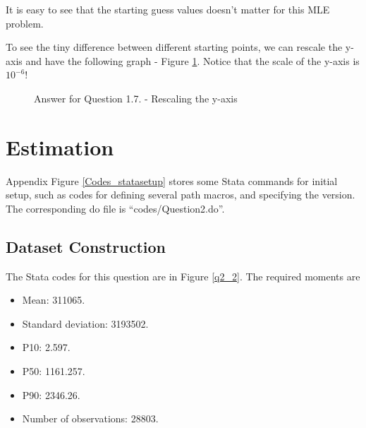 \documentclass[12pt]{article}
\theoremstyle{definition}
\begin{document}
It is easy to see that the starting guess values doesn't matter for this MLE problem.

To see the tiny difference between different starting points, we can rescale the y-axis and have the following graph - Figure \ref{r1_7_rescaling}. Notice that the scale of the y-axis is $10^{-6}$!

\begin{figure}[H]
    \noindent\caption{Answer for Question 1.7. - Rescaling the y-axis}
    \begin{center}
        \label{r1_7_rescaling}
    \end{center}
\end{figure}

\section{Estimation}

Appendix Figure \ref{Codes_statasetup} stores some Stata commands for initial setup, such as codes for defining several path macros, and specifying the version. The corresponding do file is ``codes/Question2.do''.

\setcounter{subsection}{1}
\subsection{Dataset Construction}

The Stata codes for this question are in Figure \ref{q2_2}. The required moments are 
\begin{itemize}[topsep=0pt, leftmargin=20pt, itemsep=0pt]
\setlength{\parskip}{10pt} 
\item Mean: 311065.
\item Standard deviation: 3193502.
\item P10: 2.597.
\item P50: 1161.257.
\item P90: 2346.26.
\item Number of observations: 28803.
\end{itemize}
\end{document}
